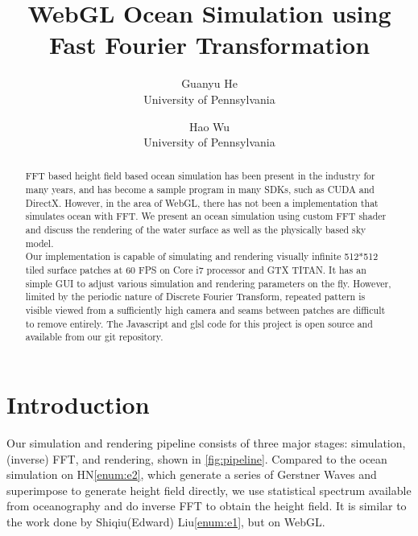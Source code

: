 \documentclass{jcgt}
\begin{document}
\title{WebGL Ocean Simulation using Fast Fourier Transformation}

\author
       {Guanyu He\\University of Pennsylvania
        \and Hao Wu\\University of Pennsylvania
       }



\maketitle
\thispagestyle{firstpagestyle}

\begin{abstract}
FFT based height field based ocean simulation has been present in the industry for many years, and has become a sample program in many SDKs, such as CUDA and DirectX. However, in the area of WebGL,  there has not been a implementation that simulates ocean with FFT. We present an ocean simulation using custom FFT shader and discuss the rendering of the water surface as well as the physically based sky model.\\

Our implementation is capable of simulating and rendering visually infinite 512*512 tiled surface patches at 60 FPS on Core i7 processor and GTX TITAN. It has an simple GUI to adjust various simulation and rendering parameters on the fly. However, limited by the periodic nature of Discrete Fourier Transform, repeated pattern is visible viewed from a sufficiently high camera and seams between patches are difficult to remove entirely.
The Javascript and glsl code for this project is open source and available from our git repository.

\end{abstract}


\section{Introduction}
\label{sec:introduction}
Our simulation and rendering pipeline consists of three major stages: simulation, (inverse) FFT, and rendering, shown in \ref{fig:pipeline}. Compared to the ocean simulation on HN\ref{enum:e2}, which generate a series of Gerstner Waves and superimpose to generate height field directly, we use statistical spectrum available from oceanography and do inverse FFT to obtain the height field. It is similar to the work done by Shiqiu(Edward) Liu\ref{enum:e1}, but on WebGL.
\end{document}
